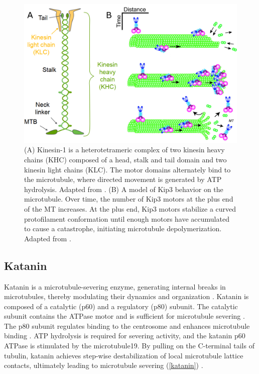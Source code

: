 \begin{figure}[h!tb]
\centering
\includegraphics[scale=0.3]{Figures/kinesins.png}
\caption[Introduction to kinesins.]{
(A) Kinesin-1 is a heterotetrameric complex of two kinesin heavy chains (KHC) composed of a head, stalk and tail domain and two kinesin light chains (KLC). The motor domains alternately bind to the microtubule, where directed movement is generated by ATP hydrolysis. Adapted from \cite{kawaguchi}. (B) A model of Kip3 behavior on the microtubule. Over time, the number of Kip3 motors at the plus end of the MT increases. At the plus end, Kip3 motors stabilize a curved protofilament conformation until enough motors have accumulated to cause a catastrophe, initiating microtubule depolymerization. Adapted from \cite{weaver}.
	}\label{kinesins}
\end{figure}

\subsection{Katanin}
Katanin is a microtubule-severing enzyme, generating internal breaks in microtubules, thereby modulating their dynamics and organization \parencite{ROLLMECAK201096}. Katanin is composed of a catalytic (p60) and a regulatory (p80) subunit. The catalytic subunit contains the ATPase motor and is sufficient for microtubule severing \parencite{McNally2014}. The p80 subunit regulates binding to the centrosome and enhances microtubule binding \parencite{Joly3604}. ATP hydrolysis is required for severing activity, and the katanin p60 ATPase is stimulated by the microtubule19. By pulling on the C-terminal tails of tubulin, katanin achieves step-wise destabilization of local microtubule lattice contacts, ultimately leading to microtubule severing (\autoref{katanin}) \parencite{McNally2014}.
\label{sec:katanin}

